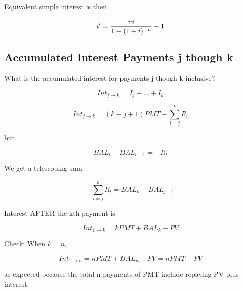 \documentclass{article}
\theoremstyle{definition} %
\theoremstyle{definition} %
\theoremstyle{remark} %
\begin{document}
Equivalent simple interest is then

\begin{equation}
i' =  {n i \over  1-(1+i)^{-n}} -1
\end{equation}

\subsection{Accumulated Interest Payments j though k}

What is the accumulated interest for payments j though k inclusive?

\begin{equation}
Int_{j \rightarrow k} = I_j + \ldots + I_k
\end{equation}

\begin{equation}
Int_{j \rightarrow k} = \left( k - j + 1 \right) PMT - \sum_{l=j}^k R_l
\end{equation}

but

\begin{equation}
BAL_l - BAL_{l-1} = -R_l
\end{equation}

We get a telescoping sum

\begin{equation}
- \sum_{l=j}^k R_l = BAL_k - BAL_{j-1}
\end{equation}

Interest AFTER the kth payment is

\begin{equation}
Int_{1 \rightarrow k}  = k PMT + BAL_k - PV
\end{equation}

Check:  When $k=n$,

\begin{equation}
Int_{1 \rightarrow n}  = n PMT + BAL_n - PV = n PMT - PV
\end{equation}

as expected because the total n payments of PMT include repaying PV plus interest.
\end{document}
